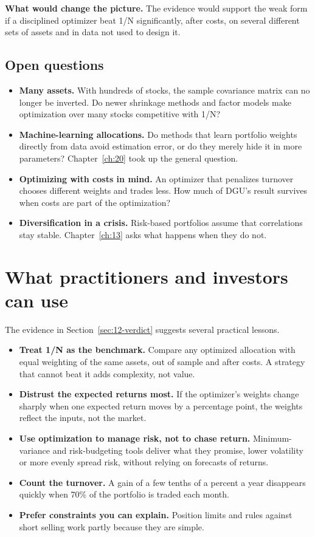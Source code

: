 \textbf{What would change the picture.} The evidence would support the weak form if a disciplined optimizer beat 1/N significantly, after costs, on several different sets of assets and in data not used to design it.

\subsection{Open questions}
\label{sec:12-open}

\begin{itemize}
  \item \textbf{Many assets.} With hundreds of stocks, the sample covariance matrix can no longer be inverted. Do newer shrinkage methods and factor models make optimization over many stocks competitive with 1/N?
  \item \textbf{Machine-learning allocations.} Do methods that learn portfolio weights directly from data avoid estimation error, or do they merely hide it in more parameters? Chapter~\ref{ch:20} took up the general question.
  \item \textbf{Optimizing with costs in mind.} An optimizer that penalizes turnover chooses different weights and trades less. How much of DGU's result survives when costs are part of the optimization?
  \item \textbf{Diversification in a crisis.} Risk-based portfolios assume that correlations stay stable. Chapter~\ref{ch:13} asks what happens when they do not.
\end{itemize}

\section{What practitioners and investors can use}
\label{sec:12-investors}

The evidence in Section~\ref{sec:12-verdict} suggests several practical lessons.

\begin{itemize}
  \item \textbf{Treat 1/N as the benchmark.} Compare any optimized allocation with equal weighting of the same assets, out of sample and after costs. A strategy that cannot beat it adds complexity, not value.
  \item \textbf{Distrust the expected returns most.} If the optimizer's weights change sharply when one expected return moves by a percentage point, the weights reflect the inputs, not the market.
  \item \textbf{Use optimization to manage risk, not to chase return.} Minimum-variance and risk-budgeting tools deliver what they promise, lower volatility or more evenly spread risk, without relying on forecasts of returns.
  \item \textbf{Count the turnover.} A gain of a few tenths of a percent a year disappears quickly when 70\% of the portfolio is traded each month.
  \item \textbf{Prefer constraints you can explain.} Position limits and rules against short selling work partly because they are simple.
\end{itemize}

